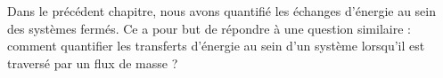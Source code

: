 Dans le précédent chapitre, nous avons quantifié les échanges d’énergie au sein des systèmes fermés. Ce \courstrois a pour but de répondre à une question similaire : comment quantifier les transferts d’énergie au sein d’un système lorsqu’il est traversé par un flux de masse ?
